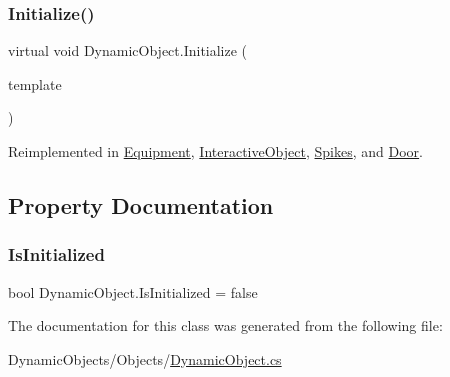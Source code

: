 \subsubsection{\texorpdfstring{Initialize()}{Initialize()}}
{\footnotesize\ttfamily virtual void Dynamic\+Object.\+Initialize (\begin{DoxyParamCaption}\item[{\mbox{\hyperlink{class_dynamic_object_template}{Dynamic\+Object\+Template}}}]{template }\end{DoxyParamCaption})\hspace{0.3cm}{\ttfamily [virtual]}}



Reimplemented in \mbox{\hyperlink{class_equipment_a4ba8229a93cd0f2872f7249fbbb56c23}{Equipment}}, \mbox{\hyperlink{class_interactive_object_a6337da87a5251d5eb65dccb7f1f76d16}{Interactive\+Object}}, \mbox{\hyperlink{class_spikes_a24d8653eda16bb5bdfb56c856c456153}{Spikes}}, and \mbox{\hyperlink{class_door_acb583e1e2040bb093c035ec0fa03d273}{Door}}.



\subsection{Property Documentation}
\mbox{\label{class_dynamic_object_a3d8a7d1c1a8630b595aded3b0d171334}} 
\subsubsection{\texorpdfstring{Is\+Initialized}{IsInitialized}}
{\footnotesize\ttfamily bool Dynamic\+Object.\+Is\+Initialized = false\hspace{0.3cm}{\ttfamily [get]}}



The documentation for this class was generated from the following file\+:\begin{DoxyCompactItemize}
\item 
Dynamic\+Objects/\+Objects/\mbox{\hyperlink{_dynamic_object_8cs}{Dynamic\+Object.\+cs}}\end{DoxyCompactItemize}
